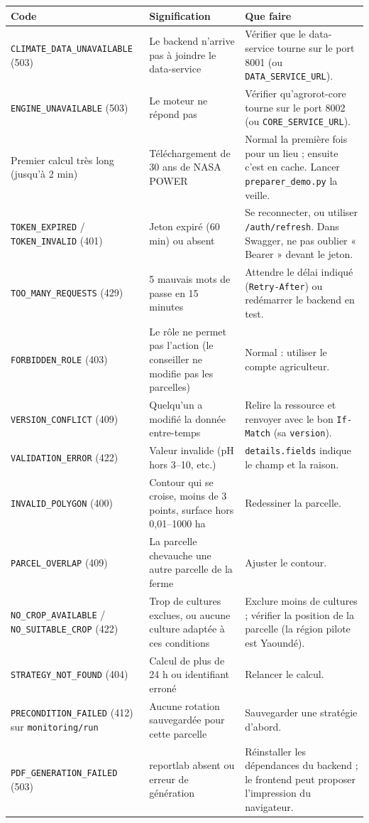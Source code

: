 \documentclass[11pt,a4paper]{article}
\begin{document}
\begin{center}
\small
\begin{longtable}{L{4.4cm}L{4.4cm}L{6.2cm}}
\toprule
\textbf{Code} & \textbf{Signification} & \textbf{Que faire} \\
\midrule
\endhead
\texttt{CLIMATE\_DATA\_UNAVAILABLE} (503) & Le backend n'arrive pas à joindre le data-service & Vérifier que le data-service tourne sur le port 8001 (ou \texttt{DATA\_SERVICE\_URL}). \\
\texttt{ENGINE\_UNAVAILABLE} (503) & Le moteur ne répond pas & Vérifier qu'agrorot-core tourne sur le port 8002 (ou \texttt{CORE\_SERVICE\_URL}). \\
Premier calcul très long (jusqu'à 2 min) & Téléchargement de 30 ans de NASA POWER & Normal la première fois pour un lieu ; ensuite c'est en cache. Lancer \texttt{preparer\_demo.py} la veille. \\
\texttt{TOKEN\_EXPIRED} / \texttt{TOKEN\_INVALID} (401) & Jeton expiré (60 min) ou absent & Se reconnecter, ou utiliser \texttt{/auth/refresh}. Dans Swagger, ne pas oublier « Bearer » devant le jeton. \\
\texttt{TOO\_MANY\_REQUESTS} (429) & 5 mauvais mots de passe en 15 minutes & Attendre le délai indiqué (\texttt{Retry-After}) ou redémarrer le backend en test. \\
\texttt{FORBIDDEN\_ROLE} (403) & Le rôle ne permet pas l'action (le conseiller ne modifie pas les parcelles) & Normal : utiliser le compte agriculteur. \\
\texttt{VERSION\_CONFLICT} (409) & Quelqu'un a modifié la donnée entre-temps & Relire la ressource et renvoyer avec le bon \texttt{If-Match} (sa \texttt{version}). \\
\texttt{VALIDATION\_ERROR} (422) & Valeur invalide (pH hors 3–10, etc.) & \texttt{details.fields} indique le champ et la raison. \\
\texttt{INVALID\_POLYGON} (400) & Contour qui se croise, moins de 3 points, surface hors 0,01–1000 ha & Redessiner la parcelle. \\
\texttt{PARCEL\_OVERLAP} (409) & La parcelle chevauche une autre parcelle de la ferme & Ajuster le contour. \\
\texttt{NO\_CROP\_AVAILABLE} / \texttt{NO\_SUITABLE\_CROP} (422) & Trop de cultures exclues, ou aucune culture adaptée à ces conditions & Exclure moins de cultures ; vérifier la position de la parcelle (la région pilote est Yaoundé). \\
\texttt{STRATEGY\_NOT\_FOUND} (404) & Calcul de plus de 24 h ou identifiant erroné & Relancer le calcul. \\
\texttt{PRECONDITION\_FAILED} (412) sur \texttt{monitoring/run} & Aucune rotation sauvegardée pour cette parcelle & Sauvegarder une stratégie d'abord. \\
\texttt{PDF\_GENERATION\_FAILED} (503) & reportlab absent ou erreur de génération & Réinstaller les dépendances du backend ; le frontend peut proposer l'impression du navigateur. \\
\bottomrule
\end{longtable}
\end{center}
\end{document}
